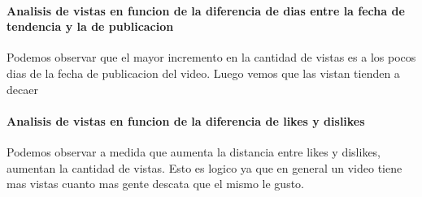         \paragraph{Analisis de vistas en funcion de la diferencia de dias entre la fecha de tendencia y la de publicacion}

            \begin{figure}[ht]
            \end{figure}
        \FloatBarrier
        Podemos observar que el mayor incremento en la cantidad de vistas es a
        los pocos dias de la fecha de publicacion del video. Luego vemos que
        las vistan tienden a decaer
        \newpage

        \paragraph{Analisis de vistas en funcion de la diferencia de likes y dislikes}

            \begin{figure}[ht]
            \end{figure}
        \FloatBarrier
        Podemos observar a medida que aumenta la distancia entre likes y dislikes,
        aumentan la cantidad de vistas. Esto es logico ya que en general un video
        tiene mas vistas cuanto mas gente descata que el mismo le gusto.
        \newpage

